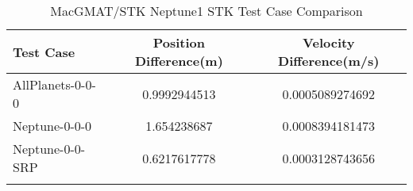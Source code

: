 \begin{table}[htbp!]
\centering
\caption{ MacGMAT/STK Neptune1 STK Test Case Comparison}
      \begin{tabular}{lcc}
      \hline\hline
          Test Case & Position Difference(m) & Velocity Difference(m/s) \\
         \hline
         AllPlanets-0-0-0 & 0.9992944513 & 0.0005089274692 \\
         Neptune-0-0-0 & 1.654238687 & 0.0008394181473 \\
         Neptune-0-0-SRP & 0.6217617778 & 0.0003128743656 \\
      \hline\hline
      \label{Table: Neptune1 STK Table} 
\end{tabular}
\end{table}
